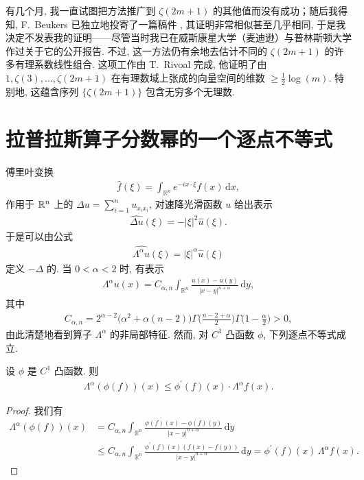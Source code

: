 有几个月, 我一直试图把方法推广到 $\zeta(2m+1)$ 的其他值而没有成功；随后我得知, F.~Beukers 已独立地投寄了一篇稿件 \cite{b19}, 其证明非常相似甚至几乎相同, 于是我决定不发表我的证明——尽管当时我已在威斯康星大学（麦迪逊）与普林斯顿大学作过关于它的公开报告. 不过, 这一方法仍有余地去估计不同的 $\zeta(2m+1)$ 的许多有理系数线性组合. 这项工作由 T.~Rivoal \cite{b38} 完成, 他证明了由 $1, \zeta(3), \ldots, \zeta(2m+1)$ 在有理数域上张成的向量空间的维数 $\geq \frac{1}{2}\log(m)$. 特别地, 这蕴含序列 $\{\zeta(2m+1)\}$ 包含无穷多个无理数.

\section{拉普拉斯算子分数幂的一个逐点不等式}

傅里叶变换
\begin{align*}
  \widehat{f}(\xi)=\int_{\mathbb{R}^{n}}e^{-i x\cdot\xi}f(x)\,\mathrm{d}x,
\end{align*}
作用于 $\mathbb{R}^n$ 上的 $\Delta u = \sum_{i=1}^{n} u_{x_i x_i}$, 对速降光滑函数 $u$ 给出表示
\begin{align*}
  \widehat{\Delta u}(\xi)=-|\xi|^{2}\widehat{u}(\xi).
\end{align*}
于是可以由公式
\begin{align*}
  \widehat{\Lambda^{\alpha}u}(\xi)=|\xi|^{\alpha}\widehat{u}(\xi)
\end{align*}
定义 $-\Delta$ 的. 当 $0 < \alpha < 2$ 时, 有表示
\begin{align*}
  \Lambda^{\alpha}u(x)=C_{\alpha,n}\int_{\mathbb{R}^{n}}\frac{u(x)-u(y)}{|x-y|^{n+\alpha}}\,\mathrm{d}y,
\end{align*}
其中
\begin{align*}
  C_{\alpha,n}=2^{\alpha-2}\bigl(\alpha^{2}+\alpha(n-2)\bigr)
  \Gamma\Big(\frac{n-2+\alpha}{2}\Big)\Gamma\Big(1-\frac{\alpha}{2}\Big)>0,
\end{align*}
由此清楚地看到算子 $\Lambda^{\alpha}$ 的非局部特征. 然而, 对 $C^1$ 凸函数 $\phi$, 下列逐点不等式成立.

\begin{theorem}\label{thm:1.5}
设 $\phi$ 是 $C^{1}$ 凸函数. 则
\begin{align*}
  \Lambda^{\alpha}(\phi(f))(x)\leq\phi^{\prime}(f)(x)\cdot\Lambda^{\alpha}f(x).
\end{align*}
\end{theorem}

\begin{proof}
我们有
\begin{align*}
  \Lambda^{\alpha}(\phi(f))(x)
  &=C_{\alpha,n}\int_{\mathbb{R}^{n}}\frac{\phi(f)(x)-\phi(f)(y)}{|x-y|^{n+\alpha}}\,\mathrm{d}y\\
  &\leq C_{\alpha,n}\int_{\mathbb{R}^{n}}\frac{\phi^{\prime}(f)(x)(f(x)-f(y))}{|x-y|^{n+\alpha}}\,\mathrm{d}y
  =\phi^{\prime}(f)(x)\,\Lambda^{\alpha}f(x).
\end{align*}
\end{proof}

